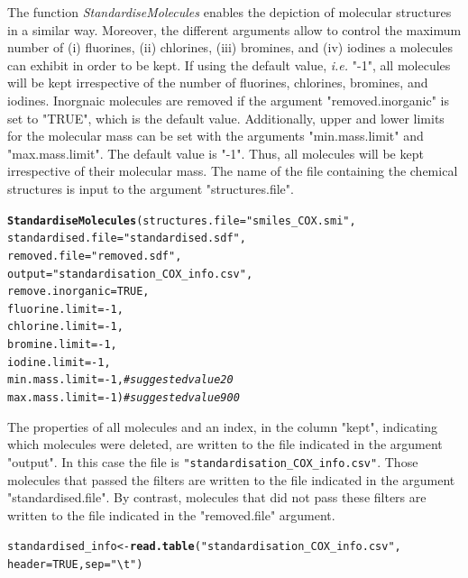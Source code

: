 \documentclass[twoside,a4wide,12pt]{article}\usepackage[]{graphicx}\usepackage[]{color}
\makeatletter
\newcommand{\hlnum}[1]{\textcolor[rgb]{0.686,0.059,0.569}{#1}}%
\newcommand{\hlstr}[1]{\textcolor[rgb]{0.192,0.494,0.8}{#1}}%
\newcommand{\hlcom}[1]{\textcolor[rgb]{0.678,0.584,0.686}{\textit{#1}}}%
\newcommand{\hlopt}[1]{\textcolor[rgb]{0,0,0}{#1}}%
\newcommand{\hlstd}[1]{\textcolor[rgb]{0.345,0.345,0.345}{#1}}%
\newcommand{\hlkwb}[1]{\textcolor[rgb]{0.69,0.353,0.396}{#1}}%
\newcommand{\hlkwc}[1]{\textcolor[rgb]{0.333,0.667,0.333}{#1}}%
\newcommand{\hlkwd}[1]{\textcolor[rgb]{0.737,0.353,0.396}{\textbf{#1}}}%
\newenvironment{kframe}{%
 \def\at@end@of@kframe{}%
 \ifinner\ifhmode%
  \def\at@end@of@kframe{\end{minipage}}%
  \begin{minipage}{\columnwidth}%
 \fi\fi%
 \def\FrameCommand##1{\hskip\@totalleftmargin \hskip-\fboxsep
 \colorbox{shadecolor}{##1}\hskip-\fboxsep
     \hskip-\linewidth \hskip-\@totalleftmargin \hskip\columnwidth}%
 \MakeFramed {\advance\hsize-\width
   \@totalleftmargin\z@ \linewidth\hsize
   \@setminipage}}%
 {\par\unskip\endMakeFramed%
 \at@end@of@kframe}
\newenvironment{knitrout}{}{} %
\makeatother
\begin{document}
The function {\it StandardiseMolecules} enables the depiction of molecular structures in a similar way.
Moreover, the different arguments allow to control the maximum number of (i) fluorines, (ii) chlorines,
(iii) bromines, and (iv) iodines a molecules can exhibit in order to be kept. If using the default value, {\it i.e.} "-1",
all molecules will be kept irrespective of the number of fluorines, chlorines, bromines, and iodines.
Inorgnaic molecules are removed if the argument "removed.inorganic" is set to "TRUE", which is the default value.
Additionally, upper and lower limits for the molecular mass can be set with the arguments "min.mass.limit" and "max.mass.limit".
The default value is "-1". Thus, all molecules will be kept irrespective of their molecular mass.
The name of the file containing the chemical structures is input to the argument "structures.file".
\begin{knitrout}
\color{fgcolor}\begin{kframe}
\begin{alltt}
\hlkwd{StandardiseMolecules}\hlstd{(}\hlkwc{structures.file}\hlstd{=}\hlstr{"smiles_COX.smi"}\hlstd{,}
\hlkwc{standardised.file}\hlstd{=}\hlstr{"standardised.sdf"}\hlstd{,}
\hlkwc{removed.file}\hlstd{=}\hlstr{"removed.sdf"}\hlstd{,}
\hlkwc{output}\hlstd{=}\hlstr{"standardisation_COX_info.csv"}\hlstd{,}
\hlkwc{remove.inorganic}\hlstd{=}\hlnum{TRUE}\hlstd{,}
\hlkwc{fluorine.limit}\hlstd{=}\hlopt{-}\hlnum{1}\hlstd{,}
\hlkwc{chlorine.limit}\hlstd{=}\hlopt{-}\hlnum{1}\hlstd{,}
\hlkwc{bromine.limit}\hlstd{=}\hlopt{-}\hlnum{1}\hlstd{,}
\hlkwc{iodine.limit}\hlstd{=}\hlopt{-}\hlnum{1}\hlstd{,}
\hlkwc{min.mass.limit}\hlstd{=}\hlopt{-}\hlnum{1}\hlstd{,} \hlcom{#suggested value 20}
\hlkwc{max.mass.limit}\hlstd{=}\hlopt{-}\hlnum{1}\hlstd{)} \hlcom{#suggested value  900}
\end{alltt}
\end{kframe}
\end{knitrout}

The properties of all molecules and an index, in the column "kept", indicating which molecules were deleted,
are written to the file indicated in the argument "output". In this case the file is \verb|"standardisation_COX_info.csv"|.
Those molecules that passed the filters are written to the file indicated in the argument "standardised.file".
By contrast, molecules that did not pass these filters are written to the file indicated in the "removed.file" argument.

\begin{knitrout}
\color{fgcolor}\begin{kframe}
\begin{alltt}
\hlstd{standardised_info} \hlkwb{<-} \hlkwd{read.table}\hlstd{(}\hlstr{"standardisation_COX_info.csv"}\hlstd{,}
    \hlkwc{header} \hlstd{=} \hlnum{TRUE}\hlstd{,} \hlkwc{sep} \hlstd{=} \hlstr{"\textbackslash{}t"}\hlstd{)}
\end{alltt}
\end{kframe}
\end{knitrout}
\end{document}
